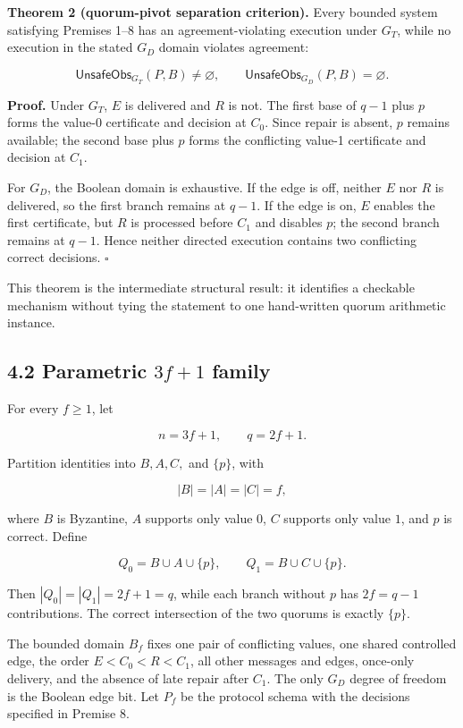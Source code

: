 \textbf{Theorem 2 (quorum-pivot separation criterion).} Every bounded
system satisfying Premises 1--8 has an agreement-violating execution
under \(G_T\), while no execution in the stated \(G_D\) domain violates
agreement:

\[
\mathsf{UnsafeObs}_{G_T}(P,B)\neq\varnothing,
\qquad
\mathsf{UnsafeObs}_{G_D}(P,B)=\varnothing.
\]

\textbf{Proof.} Under \(G_T\), \(E\) is delivered and \(R\) is not. The
first base of \(q-1\) plus \(p\) forms the value-0 certificate and
decision at \(C_0\). Since repair is absent, \(p\) remains available;
the second base plus \(p\) forms the conflicting value-1 certificate and
decision at \(C_1\).

For \(G_D\), the Boolean domain is exhaustive. If the edge is off,
neither \(E\) nor \(R\) is delivered, so the first branch remains at
\(q-1\). If the edge is on, \(E\) enables the first certificate, but
\(R\) is processed before \(C_1\) and disables \(p\); the second branch
remains at \(q-1\). Hence neither directed execution contains two
conflicting correct decisions. \(\square\)

This theorem is the intermediate structural result: it identifies a
checkable mechanism without tying the statement to one hand-written
quorum arithmetic instance.

\subsection{\texorpdfstring{4.2 Parametric \(3f+1\)
family}{4.2 Parametric 3f+1 family}}\label{parametric-3f1-family}

For every \(f\geq1\), let

\[
n=3f+1,\qquad q=2f+1.
\]

Partition identities into \(B,A,C,\) and \(\{p\}\), with

\[
|B|=|A|=|C|=f,
\]

where \(B\) is Byzantine, \(A\) supports only value \(0\), \(C\)
supports only value \(1\), and \(p\) is correct. Define

\[
Q_0=B\cup A\cup\{p\},
\qquad
Q_1=B\cup C\cup\{p\}.
\]

Then \(|Q_0|=|Q_1|=2f+1=q\), while each branch without \(p\) has
\(2f=q-1\) contributions. The correct intersection of the two quorums is
exactly \(\{p\}\).

The bounded domain \(B_f\) fixes one pair of conflicting values, one
shared controlled edge, the order \(E<C_0<R<C_1\), all other messages
and edges, once-only delivery, and the absence of late repair after
\(C_1\). The only \(G_D\) degree of freedom is the Boolean edge bit. Let
\(P_f\) be the protocol schema with the decisions specified in Premise
8.

